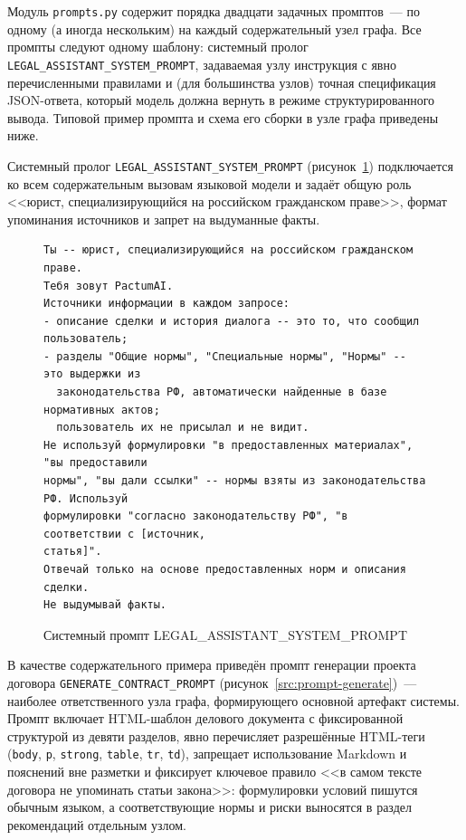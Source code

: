 
Модуль \texttt{prompts.py} содержит порядка двадцати задачных промптов~--- по одному (а иногда нескольким) на каждый содержательный узел графа. Все промпты следуют одному шаблону: системный пролог \texttt{LEGAL\_ASSISTANT\_SYSTEM\_PROMPT}, задаваемая узлу инструкция с явно перечисленными правилами и (для большинства узлов) точная спецификация JSON-ответа, который модель должна вернуть в режиме структурированного вывода. Типовой пример промпта и схема его сборки в узле графа приведены ниже.

Системный пролог \texttt{LEGAL\_ASSISTANT\_SYSTEM\_PROMPT} (рисунок~\ref{src:prompt-system}) подключается ко всем содержательным вызовам языковой модели и задаёт общую роль <<юрист, специализирующийся на российском гражданском праве>>, формат упоминания источников и запрет на выдуманные факты.

\begin{figure}[H]
\begin{lstlisting}[style=promptstyle]
Ты -- юрист, специализирующийся на российском гражданском праве.
Тебя зовут PactumAI.
Источники информации в каждом запросе:
- описание сделки и история диалога -- это то, что сообщил пользователь;
- разделы "Общие нормы", "Специальные нормы", "Нормы" -- это выдержки из
  законодательства РФ, автоматически найденные в базе нормативных актов;
  пользователь их не присылал и не видит.
Не используй формулировки "в предоставленных материалах", "вы предоставили
нормы", "вы дали ссылки" -- нормы взяты из законодательства РФ. Используй
формулировки "согласно законодательству РФ", "в соответствии с [источник,
статья]".
Отвечай только на основе предоставленных норм и описания сделки.
Не выдумывай факты.
\end{lstlisting}
\caption{Системный промпт LEGAL\_ASSISTANT\_SYSTEM\_PROMPT}
\label{src:prompt-system}
\end{figure}

В качестве содержательного примера приведён промпт генерации проекта договора \texttt{GENERATE\_CONTRACT\_PROMPT} (рисунок~\ref{src:prompt-generate})~--- наиболее ответственного узла графа, формирующего основной артефакт системы. Промпт включает HTML-шаблон делового документа с фиксированной структурой из девяти разделов, явно перечисляет разрешённые HTML-теги (\texttt{body}, \texttt{p}, \texttt{strong}, \texttt{table}, \texttt{tr}, \texttt{td}), запрещает использование Markdown и пояснений вне разметки и фиксирует ключевое правило <<в самом тексте договора не упоминать статьи закона>>: формулировки условий пишутся обычным языком, а соответствующие нормы и риски выносятся в раздел рекомендаций отдельным узлом.

